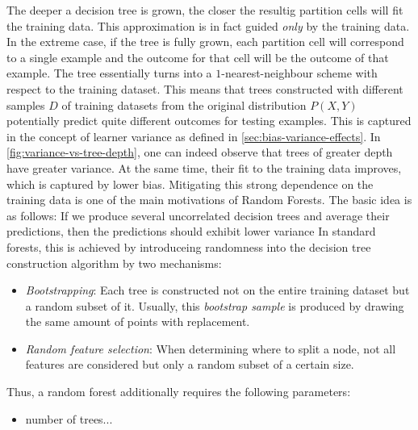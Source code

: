\documentclass[../main.tex]{subfiles}
\begin{document}
The deeper a decision tree is grown, the closer the resultig partition cells will fit the training data. This approximation is in fact guided \textit{only} by the training data. In the extreme case, if the tree is fully grown, each partition cell will correspond to a single example and the outcome for that cell will be the outcome of that example. The tree essentially turns into a $1$-nearest-neighbour scheme with respect to the training dataset. This means that trees constructed with different samples $D$ of training datasets from the original distribution $P(X,Y)$ potentially predict quite different outcomes for testing examples. This is captured in the concept of learner variance as defined in \ref{sec:bias-variance-effects}. In \ref{fig:variance-vs-tree-depth}, one can indeed observe that trees of greater depth have greater variance. At the same time, their fit to the training data improves, which is captured by lower bias.
Mitigating this strong dependence on the training data is one of the main motivations of Random Forests. The basic idea is as follows: If we produce several uncorrelated decision trees and average their predictions, then the predictions should exhibit lower variance
In standard forests, this is achieved by introduceing randomness into the decision tree construction algorithm by two mechanisms:
\begin{itemize}
\item \textit{Bootstrapping}: Each tree is constructed not on the entire training dataset but a random subset of it. Usually, this \textit{bootstrap sample} is produced by drawing the same amount of points with replacement.
\item \textit{Random feature selection}: When determining where to split a node, not all features are considered but only a random subset of a certain size.
\end{itemize}

Thus, a random forest additionally requires the following parameters:
\begin{itemize}
\item number of trees...
\end{itemize}


\end{document}
